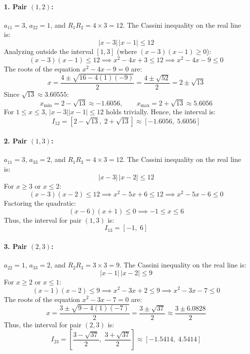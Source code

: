 \documentclass[11pt,a4paper]{article}
\newcommand{\abs}[1]{\left\lvert#1\right\rvert}
\begin{document}
\paragraph{1. Pair $(1, 2)$:} $a_{11} = 3$, $a_{22} = 1$, and $R_1 R_2 = 4 \times 3 = 12$.
The Cassini inequality on the real line is:
\begin{equation}
\abs{x - 3} \, \abs{x - 1} \le 12
\end{equation}
Analyzing outside the interval $[1, 3]$ (where $(x-3)(x-1) \ge 0$):
\[
(x - 3)(x - 1) \le 12 \implies x^2 - 4x + 3 \le 12 \implies x^2 - 4x - 9 \le 0
\]
The roots of the equation $x^2 - 4x - 9 = 0$ are:
\[
x = \frac{4 \pm \sqrt{16 - 4(1)(-9)}}{2} = \frac{4 \pm \sqrt{52}}{2} = 2 \pm \sqrt{13}
\]
Since $\sqrt{13} \approx 3.60555$:
\[
x_{\min} = 2 - \sqrt{13} \approx -1.6056, \qquad x_{\max} = 2 + \sqrt{13} \approx 5.6056
\]
For $1 \le x \le 3$, $\abs{x - 3}\abs{x - 1} \le 12$ holds trivially. Hence, the interval is:
\begin{equation}
I_{12} = \left[ 2 - \sqrt{13}, \; 2 + \sqrt{13} \right] \approx [-1.6056, \; 5.6056]
\end{equation}

\paragraph{2. Pair $(1, 3)$:} $a_{11} = 3$, $a_{33} = 2$, and $R_1 R_3 = 4 \times 3 = 12$.
The Cassini inequality on the real line is:
\begin{equation}
\abs{x - 3} \, \abs{x - 2} \le 12
\end{equation}
For $x \ge 3$ or $x \le 2$:
\[
(x - 3)(x - 2) \le 12 \implies x^2 - 5x + 6 \le 12 \implies x^2 - 5x - 6 \le 0
\]
Factoring the quadratic:
\[
(x - 6)(x + 1) \le 0 \implies -1 \le x \le 6
\]
Thus, the interval for pair $(1, 3)$ is:
\begin{equation}
I_{13} = [-1, \; 6]
\end{equation}

\paragraph{3. Pair $(2, 3)$:} $a_{22} = 1$, $a_{33} = 2$, and $R_2 R_3 = 3 \times 3 = 9$.
The Cassini inequality on the real line is:
\begin{equation}
\abs{x - 1} \, \abs{x - 2} \le 9
\end{equation}
For $x \ge 2$ or $x \le 1$:
\[
(x - 1)(x - 2) \le 9 \implies x^2 - 3x + 2 \le 9 \implies x^2 - 3x - 7 \le 0
\]
The roots of the equation $x^2 - 3x - 7 = 0$ are:
\[
x = \frac{3 \pm \sqrt{9 - 4(1)(-7)}}{2} = \frac{3 \pm \sqrt{37}}{2} \approx \frac{3 \pm 6.0828}{2}
\]
Thus, the interval for pair $(2, 3)$ is:
\begin{equation}
I_{23} = \left[ \frac{3 - \sqrt{37}}{2}, \; \frac{3 + \sqrt{37}}{2} \right] \approx [-1.5414, \; 4.5414]
\end{equation}
\end{document}
